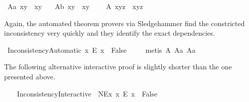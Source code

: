 \begin{isabellebody}
\ A{}a{\isacharcolon}\ {\isachardoublequoteopen}{\isasymbox}{\isacharparenleft}x\isactrlbold {\isasymcdot}y{\isacharparenright}\ {\isasymcong}\ {\isasymbox}{\isacharparenleft}x\isactrlbold {\isasymcdot}{\isacharparenleft}{\isasymbox}y{\isacharparenright}{\isacharparenright}{\isachardoublequoteclose}\ \ \isanewline
\ A{}b{\isacharcolon}\ {\isachardoublequoteopen}{\isacharparenleft}x\isactrlbold {\isasymcdot}y{\isacharparenright}{\isasymbox}\ {\isasymcong}\ {\isacharparenleft}{\isacharparenleft}x{\isasymbox}{\isacharparenright}\isactrlbold {\isasymcdot}y{\isacharparenright}{\isasymbox}{\isachardoublequoteclose}\ \ \isanewline
\ \ A{}{\isacharcolon}\ {\isachardoublequoteopen}x\isactrlbold {\isasymcdot}{\isacharparenleft}y\isactrlbold {\isasymcdot}z{\isacharparenright}\ {\isasymcong}\ {\isacharparenleft}x\isactrlbold {\isasymcdot}y{\isacharparenright}\isactrlbold {\isasymcdot}z{\isachardoublequoteclose}%
\begin{isamarkuptext}%
\label{subsec:FreydNotation} Again, the automated theorem provers via Sledgehammer 
       find the constricted inconsistency very quickly and they identify the  exact dependencies.%
\end{isamarkuptext}\isamarkuptrue%
\isamarkupfalse%
\ InconsistencyAutomatic{\isacharcolon}\ {\isachardoublequoteopen}{\isacharparenleft}{\isasymexists}x{\isachardot}\ \isactrlbold {\isasymnot}{\isacharparenleft}E\ x{\isacharparenright}{\isacharparenright}\ \isactrlbold {\isasymrightarrow}\ False{\isachardoublequoteclose}\ \isanewline
%
\isadelimproof
\ \ %
\endisadelimproof
%
\isatagproof
{}\isamarkupfalse%
\ {\isacharparenleft}metis\ A{}\ A{}a\ A{}a{\isacharparenright}%
\endisatagproof
{\isafoldproof}%
%
\isadelimproof
%
\endisadelimproof
%
\begin{isamarkuptext}%
The following alternative interactive proof is slightly shorter than the one 
        presented above.%
\end{isamarkuptext}\isamarkuptrue%
\ \ \isamarkupfalse%
\ InconsistencyInteractive{\isacharcolon}\ \ NEx{\isacharcolon}\ {\isachardoublequoteopen}{\isasymexists}x{\isachardot}\ \isactrlbold {\isasymnot}{\isacharparenleft}E\ x{\isacharparenright}{\isachardoublequoteclose}\ \ False\ \isanewline
%
\isadelimproof
\ \ %
\endisadelimproof
%
\isatagproof
{}\isamarkupfalse%
\ {\isacharminus}\isanewline
\ \ \ \ %
\end{isabellebody}
